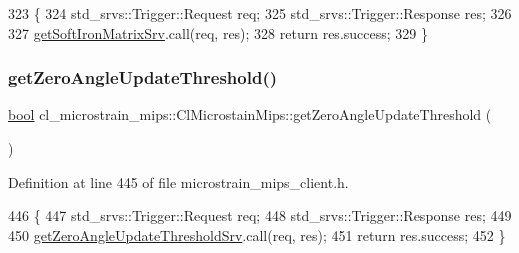 \begin{DoxyCode}
323     \{
324         std\_srvs::Trigger::Request req;
325         std\_srvs::Trigger::Response res;
326 
327         \hyperlink{classcl__microstrain__mips_1_1ClMicrostainMips_a7210454a851669073d06d82511014ecc}{getSoftIronMatrixSrv}.call(req, res);
328         \textcolor{keywordflow}{return} res.success;
329     \}
\end{DoxyCode}
\mbox{\label{classcl__microstrain__mips_1_1ClMicrostainMips_afca57a1888e4e57f6dba69083e53442d}} 
\subsubsection{\texorpdfstring{get\+Zero\+Angle\+Update\+Threshold()}{getZeroAngleUpdateThreshold()}}
{\footnotesize\ttfamily \hyperlink{classbool}{bool} cl\+\_\+microstrain\+\_\+mips\+::\+Cl\+Microstain\+Mips\+::get\+Zero\+Angle\+Update\+Threshold (\begin{DoxyParamCaption}{ }\end{DoxyParamCaption})\hspace{0.3cm}{\ttfamily [inline]}}



Definition at line 445 of file microstrain\+\_\+mips\+\_\+client.\+h.


\begin{DoxyCode}
446     \{
447         std\_srvs::Trigger::Request req;
448         std\_srvs::Trigger::Response res;
449 
450         \hyperlink{classcl__microstrain__mips_1_1ClMicrostainMips_ae720970f4114e7b6524b59df405ede83}{getZeroAngleUpdateThresholdSrv}.call(req, res);
451         \textcolor{keywordflow}{return} res.success;
452     \}
\end{DoxyCode}
\mbox{\label{classcl__microstrain__mips_1_1ClMicrostainMips_ada40a42a0d479c9651bc4a735a76ce39}} 
